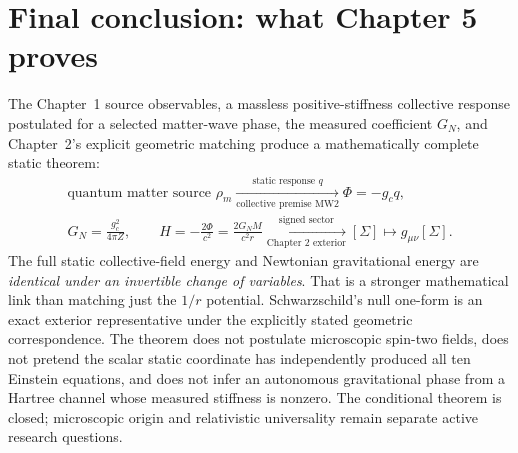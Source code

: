 \documentclass[11pt,a4paper]{article}
\theoremstyle{remark}\newtheorem{remark}[theorem]{Remark}
\begin{document}
\section{Final conclusion: what Chapter 5 proves}\label{sec:v30-final}
The Chapter~1 source observables, a massless positive-stiffness collective response postulated for a selected matter-wave phase, the measured coefficient $G_N$, and Chapter~2's explicit geometric matching produce a mathematically complete static theorem:
\begin{equation}\label{eq:v30-final}
\boxed{\begin{gathered}
\text{quantum matter source }\rho_m
\xrightarrow[\text{collective premise MW2}]{\text{static response }q}
\Phi=-g_cq,\\[-1pt]
G_N=\frac{g_c^2}{4\pi Z},\qquad
H=-\frac{2\Phi}{c^2}=\frac{2G_NM}{c^2r}
\xrightarrow[\text{Chapter 2 exterior}]{\text{signed sector}}
[\Sigma]\longmapsto g_{\mu\nu}[\Sigma].
\end{gathered}}
\end{equation}
The full static collective-field energy and Newtonian gravitational energy are \emph{identical under an invertible change of variables}. That is a stronger mathematical link than matching just the $1/r$ potential. Schwarzschild's null one-form is an exact exterior representative under the explicitly stated geometric correspondence. The theorem does not postulate microscopic spin-two fields, does not pretend the scalar static coordinate has independently produced all ten Einstein equations, and does not infer an autonomous gravitational phase from a Hartree channel whose measured stiffness is nonzero. The conditional theorem is closed; microscopic origin and relativistic universality remain separate active research questions.
\end{document}
